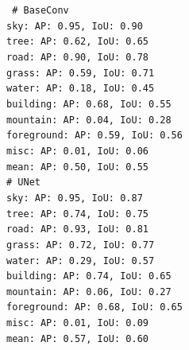 \documentclass[11pt]{article}
\begin{document}
{\centering \tt \small
\# BaseConv \\
sky: AP: 0.95, IoU: 0.90 \\
tree: AP: 0.62, IoU: 0.65 \\
road: AP: 0.90, IoU: 0.78 \\
grass: AP: 0.59, IoU: 0.71 \\
water: AP: 0.18, IoU: 0.45 \\
building: AP: 0.68, IoU: 0.55 \\
mountain: AP: 0.04, IoU: 0.28 \\
foreground: AP: 0.59, IoU: 0.56 \\
misc: AP: 0.01, IoU: 0.06 \\
mean: AP: 0.50, IoU: 0.55 \\

\# UNet \\
sky: AP: 0.95, IoU: 0.87 \\
tree: AP: 0.74, IoU: 0.75 \\
road: AP: 0.93, IoU: 0.81 \\
grass: AP: 0.72, IoU: 0.77 \\
water: AP: 0.29, IoU: 0.57 \\
building: AP: 0.74, IoU: 0.65 \\
mountain: AP: 0.06, IoU: 0.27 \\
foreground: AP: 0.68, IoU: 0.65 \\
misc: AP: 0.01, IoU: 0.09 \\
mean: AP: 0.57, IoU: 0.60 \\
}

\end{document}
